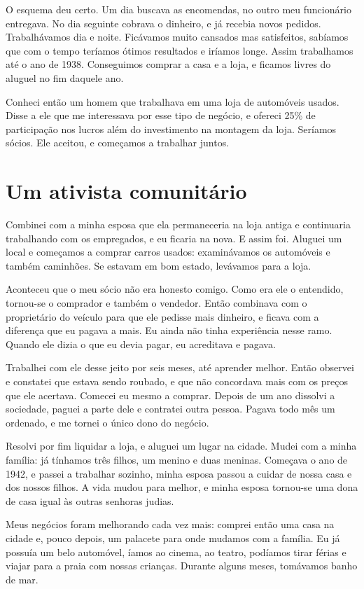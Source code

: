 O esquema deu certo. Um dia buscava as encomendas, no outro meu
funcionário entregava. No dia seguinte cobrava o dinheiro, e já
recebia novos pedidos. Trabalhávamos dia e noite. Ficávamos muito
cansados mas satisfeitos, sabíamos que com o tempo teríamos ótimos
resultados e iríamos longe. Assim trabalhamos até o ano de 1938. Conseguimos 
comprar a casa e a loja, e ficamos livres do aluguel no fim
daquele ano. 

Conheci então um homem que trabalhava em uma
loja de automóveis usados. Disse a ele que me interessava por
esse tipo de negócio, e ofereci 25\% de participação nos lucros além do
investimento na montagem da loja. Seríamos sócios. Ele aceitou, e
começamos a trabalhar juntos.

\chapter{Um ativista comunitário}

Combinei com a minha esposa que ela permaneceria na loja antiga e
continuaria trabalhando com os empregados, e eu ficaria na nova. E assim
foi. Aluguei um local e começamos a comprar carros usados: examinávamos
os automóveis e também caminhões. Se estavam em bom estado, levávamos
para a loja.

Aconteceu que o meu sócio não era honesto comigo. Como era ele o
entendido, tornou-se o comprador e também o vendedor. Então 
combinava com o proprietário do veículo para que ele pedisse mais
dinheiro, e ficava com a diferença que eu pagava a mais. Eu ainda não
tinha experiência nesse ramo. Quando ele dizia o que eu devia
pagar, eu acreditava e pagava. 

Trabalhei com ele desse jeito por seis meses,
até aprender melhor. Então observei e constatei que estava sendo roubado, 
e que não concordava mais com os preços que ele acertava. Comecei eu 
mesmo a comprar. Depois de um ano dissolvi a
sociedade, paguei a parte dele e contratei outra pessoa. Pagava todo mês
um ordenado, e me tornei o único dono do negócio.

Resolvi por fim liquidar a loja, e aluguei um lugar na cidade. Mudei com a
minha família: já tínhamos três filhos, um menino e duas meninas. Começava o ano de 1942, e passei a trabalhar sozinho, minha esposa passou a 
cuidar de nossa casa e dos nossos filhos. A vida mudou para
melhor, e minha esposa tornou-se uma dona de casa igual às outras senhoras
judias.

Meus negócios foram melhorando cada vez mais: comprei então uma casa na
cidade e, pouco depois, um palacete para onde mudamos com a família. Eu já
possuía um belo automóvel, íamos ao cinema, ao teatro, podíamos tirar
férias e viajar para a praia com nossas crianças. Durante alguns
meses, tomávamos banho de mar.

